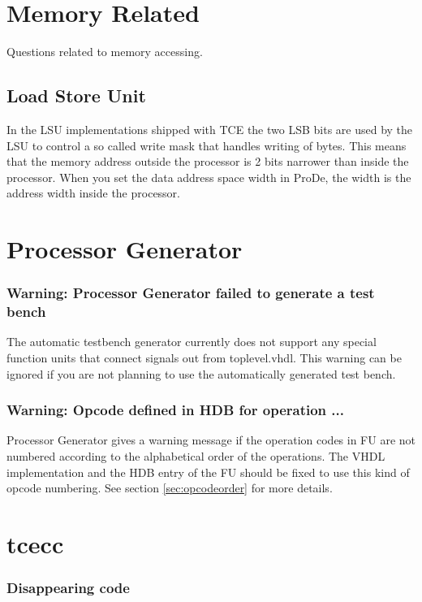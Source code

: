 \documentclass[twoside]{tceusermanual}
\begin{document}
\section{Memory Related}

Questions related to memory accessing.

\subsection{Load Store Unit}

In the LSU implementations shipped with TCE the two LSB bits are used by the LSU to control
a so called write mask that handles writing of bytes. This means that the
memory address outside the processor is 2 bits narrower than inside the
processor. When you set the data address space width in ProDe, the width
is the address width inside the processor.


\section{Processor Generator}

\subsubsection{Warning: Processor Generator failed to generate a test bench}
The automatic testbench generator currently does not support any special
function units that connect signals out from toplevel.vhdl. This warning
can be ignored if you are not planning to use the automatically generated
test bench.

\subsubsection{Warning: Opcode defined in HDB for operation ...}

Processor Generator gives a warning message if the operation codes in FU
are not numbered according to the alphabetical order of the operations.
The VHDL implementation and the HDB entry of the FU should be fixed to use 
this kind of opcode numbering. See section \ref{sec:opcodeorder} for more 
details.

\section{tcecc}

\subsubsection{Disappearing code}
\end{document}
